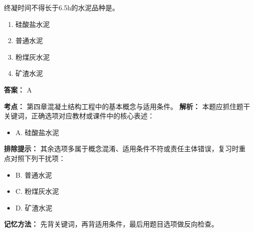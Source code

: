 \documentclass[UTF8,fontset=fandol,11pt]{ctexart}
\begin{document}
\begin{quizbox}[title={第 42 题}]
终凝时间不得长于6.5h的水泥品种是。\\
\begin{enumerate}[label=\Alph*.]
\item 硅酸盐水泥
\item 普通水泥
\item 粉煤灰水泥
\item 矿渣水泥
\end{enumerate}
\textbf{答案：} A
\vspace{0.25em}
\begin{answerbox}[title={考点解析}]
\textbf{考点：} 第四章混凝土结构工程中的基本概念与适用条件。
\textbf{解析：} 本题应抓住题干关键词，正确选项对应教材或课件中的核心表述：
\begin{itemize}
\item A. 硅酸盐水泥
\end{itemize}
\textbf{排除提示：} 其余选项多属于概念混淆、适用条件不符或责任主体错误，复习时重点对照下列干扰项：
\begin{itemize}
\item B. 普通水泥
\item C. 粉煤灰水泥
\item D. 矿渣水泥
\end{itemize}
\textbf{记忆方法：} 先背关键词，再背适用条件，最后用题目选项做反向检查。
\end{answerbox}
\end{quizbox}
\end{document}
